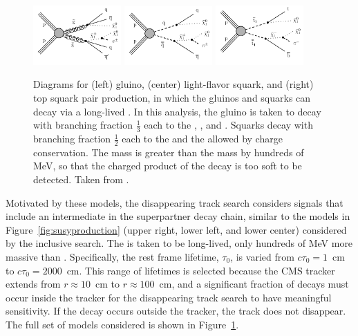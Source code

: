   \begin{figure}[htbp]
    \centering
    \includegraphics[width=0.3\textwidth]{figures/MT2_2019/Figure_010-a}
    \includegraphics[width=0.3\textwidth]{figures/MT2_2019/Figure_010-b}
    \includegraphics[width=0.3\textwidth]{figures/MT2_2019/Figure_010-c}
    \caption[Diagrams for (left) gluino, (center) light-flavor squark, and (right) top squark pair production, in which the gluinos and squarks can decay via a long-lived \chargino]{Diagrams for (left) gluino, (center) light-flavor squark, and (right) top squark pair production, in which the gluinos and squarks can decay via a long-lived \chargino. In this analysis, the gluino is taken to decay with branching fraction $\frac{1}{3}$ each to the \lsp, \chim, and \chip. Squarks decay with branching fraction $\frac{1}{2}$ each to the \lsp and the \chargino allowed by charge conservation. The \chargino mass is greater than the \lsp mass by hundreds of MeV, so that the charged product of the \chargino decay is too soft to be detected. Taken from \cite{MT2_2019}.}
    \label{fig:charginodiags}
  \end{figure}
  
  Motivated by these models, the disappearing track search considers signals that include an intermediate \chargino in the superpartner decay chain, similar to the models in Figure~\ref{fig:susyproduction} (upper right, lower left, and lower center) considered by the inclusive search.
  The \chargino is taken to be long-lived, only hundreds of MeV more massive than \lsp.
  Specifically, the rest frame \chargino lifetime, $\tau_0$, is varied from $c\tau_0 = 1$~cm to $c\tau_0 = 2000$~cm.
  This range of lifetimes is selected because the CMS tracker extends from $r\approx10$~cm to $r\approx 100$~cm, and a significant fraction of \chargino decays must occur inside the tracker for the disappearing track search to have meaningful sensitivity.
  If the decay occurs outside the tracker, the track does not disappear.
  The full set of models considered is shown in Figure~\ref{fig:charginodiags}.
  
